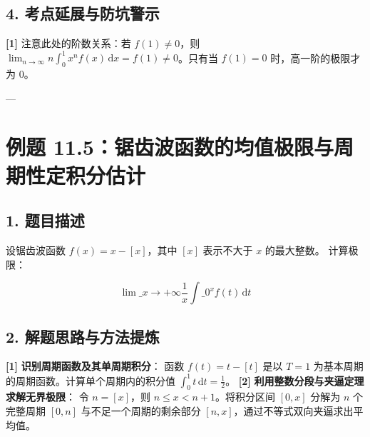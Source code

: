 \documentclass[11pt,a4paper,UTF8]{ctexart}
\begin{document}
\subsection{4. 考点延展与防坑警示}
\begin{solbox}[分步推导与答题规范]
\textbf{[1]}  注意此处的阶数关系：若 $f(1) \ne 0$，则 $\lim_{n \to \infty} n \int_0^1 x^n f(x)\,\mathrm{d}x = f(1) \ne 0$。只有当 $f(1)=0$ 时，高一阶的极限才为 $0$。
\end{solbox}

---


\section{例题 11.5：锯齿波函数的均值极限与周期性定积分估计}


\subsection{1. 题目描述}
设锯齿波函数 $f(x) = x - [x]$，其中 $[x]$ 表示不大于 $x$ 的最大整数。
计算极限：

\begin{equation*}
\lim\_{x \to +\infty} \frac{1}{x} \int\_0^x f(t)\,\mathrm{d}t
\end{equation*}



\subsection{2. 解题思路与方法提炼}
\begin{solbox}[分步推导与答题规范]
\textbf{[1]}  \textbf{识别周期函数及其单周期积分}：
函数 $f(t) = t - [t]$ 是以 $T=1$ 为基本周期的周期函数。计算单个周期内的积分值 $\int_0^1 t\,\mathrm{d}t = \frac{1}{2}$。
\textbf{[2]}  \textbf{利用整数分段与夹逼定理求解无界极限}：
令 $n = [x]$，则 $n \le x < n+1$。将积分区间 $[0, x]$ 分解为 $n$ 个完整周期 $[0, n]$ 与不足一个周期的剩余部分 $[n, x]$，通过不等式双向夹逼求出平均值。
\end{solbox}
\end{document}
